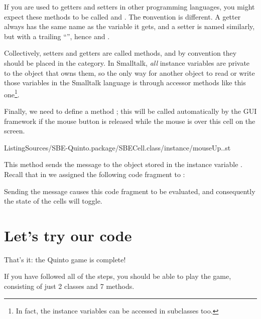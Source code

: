 \documentclass[a4paper,10pt,twoside]{book}
\begin{document}
If you are used to getters and setters in other programming languages, you might expect these methods to be called  and .
The \st convention is different.
A getter always has the same name as the variable it gets, and a setter is named similarly, but with a trailing ``\ct{:}'', hence  and .

Collectively, setters and getters are called   methods, and by convention they should be placed in the  category.
In Smalltalk, \emph{all} instance variables are private to the object that owns them, so the only way for another object to read or write those variables in the Smalltalk language is through accessor methods like this one\footnote{In fact, the instance variables can be accessed in subclasses too.}.


Finally, we need to define a method ; this will be called automatically by the GUI framework if the mouse button is released while the mouse is over this cell on the screen.

%
{ListingSources/SBE-Quinto.package/SBECell.class/instance/mouseUp..st}


This method sends the message  to the object stored in the instance variable . 
Recall that in  we assigned the following code fragment to :


\noindent
Sending the  message causes this code fragment to be evaluated, and consequently the state of the cells will toggle.

\section{Let's try our code}

That's it: the Quinto game is complete!

If you have followed all of the steps, you should be able to play the game, consisting of just 2 classes and 7 methods.
\end{document}
